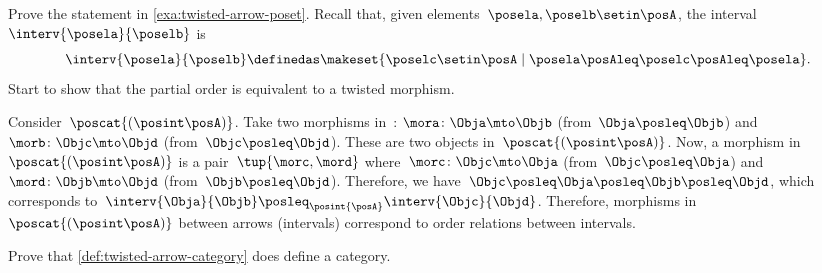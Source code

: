 \begin{exercise}
    Prove the statement in \cref{exa:twisted-arrow-poset}.
    Recall that, given elements~$\posela, \poselb \setin \posA$, the interval~$\interv{\posela}{\poselb}$ is
    \begin{equation}
        \interv{\posela}{\poselb}
        \definedas \makeset{\poselc \setin \posA \mid \posela\posAleq \poselc \posAleq \posela}.
    \end{equation}
    Start to show that the partial order is equivalent to a twisted morphism.
\end{exercise}
\begin{solution}
    Consider~$\poscat{\left(\posint\posA\right)}$.
    Take two morphisms in~\posA: $\mora\colon \Obja \mto \Objb$ (from~$\Obja \posleq \Objb$) and $\morb\colon \Objc\mto \Objd$ (from~$\Objc \posleq \Objd$).
    These are two objects in~$\poscat{\left(\posint\posA\right)}$.
    Now, a morphism in~$\poscat{\left(\posint\posA\right)}$ is a pair~$\tup{\morc,\mord}$ where~$\morc\colon \Objc \mto \Obja$ (from~$\Objc\posleq \Obja$) and~$\mord\colon \Objb \mto \Objd$ (from~$\Objb\posleq \Objd$).
    Therefore, we have~$\Objc\posleq \Obja\posleq \Objb\posleq \Objd$, which corresponds to~$\interv{\Obja}{\Objb}\posleq_{\posint{\posA}}\interv{\Objc}{\Objd}$.
    Therefore, morphisms in~$\poscat{\left(\posint\posA\right)}$ between arrows (intervals) correspond to order relations between intervals.
\end{solution}


\vfill

\begin{gradedexercise}
    \label{ex:TwistedCat}
    Prove that \cref{def:twisted-arrow-category} does define a category.
\end{gradedexercise}

